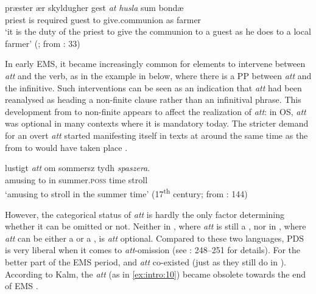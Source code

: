 \documentclass[output=paper]{langscibook}
\begin{document}
\ea \label{ex:intro:10}
\gll præster   ær   skyldugher  gest \textit{at} \textit{husla} sum  bondæ \\
  priest  is  required    guest   to  give.communion  as  farmer  \\
\glt ‘it is the duty of the priest to give the communion to a guest as he does to a local farmer’ (; from \citealt{Falk2010Språkhistoria}: 33)
\z


In early EMS, it became increasingly common for elements to intervene between \textit{att} and the verb, as in the example in  below, where there is a PP between \textit{att} and the infinitive. Such interventions can be seen as an indication that \textit{att} had been reanalysed as heading a non-finite clause rather than an infinitival phrase. This development from  to non-finite  appears to affect the realization of \textit{att}: in OS, \textit{att} was optional in many contexts where it is mandatory today. The stricter demand for an overt \textit{att} started manifesting itself in texts at around the same time as the  from  to  would have taken place \citep[35]{Falk2010Studier}.


\ea \label{ex:intro:11}
\gll  lustigt \textit{att} om     sommersz     tydh \textit{spaszera}. \\
  amusing  to   in   summer.\textsc{poss}  time  stroll\\
\glt ‘amusing to stroll in the summer time’ (17\textsuperscript{th} century; from \citealt{Kalm2016Satsekvivalenta}: 144)
\z


However, the categorical status of \textit{att} is hardly the only factor determining whether it can be omitted or not. Neither in , where \textit{att} is still a , nor in , where \textit{att} can be either a  or a , is \textit{att} optional. Compared to these two languages, PDS is very liberal when it comes to \textit{att}{}-omission (see \citealt{Faarlund2019}: 248–251 for details). For the better part of the EMS period,  and  \textit{att} co-existed (just as they still do in ). According to Kalm, the  \textit{att} (as in \ref{ex:intro:10}) became obsolete towards the end of EMS \citep[145]{Kalm2016Satsekvivalenta}.
\end{document}
